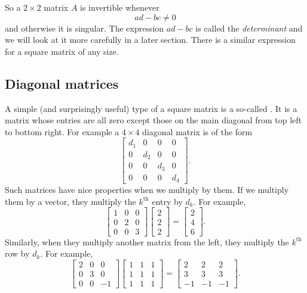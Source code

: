 So a $2 \times 2$ matrix $A$ is invertible whenever
\begin{equation*}
ad - bc \not= 0
\end{equation*}
and otherwise it is singular.  The expression $ad-bc$ is called
the \emph{determinant} and we will look at it 
more carefully in a later section.
There is a similar expression for a square
matrix of any size.

\subsection{Diagonal matrices}

A simple (and surprisingly useful) type of a square matrix is a so-called
\emph{}.  It is a matrix whose entries are all zero
except those on the main diagonal from top left to bottom right.  For
example a $4 \times 4$ diagonal matrix is of the form
\begin{equation*}
\begin{bmatrix}
d_1 & 0 & 0 & 0 \\
0 & d_2 & 0 & 0 \\
0 & 0 & d_3 & 0 \\
0 & 0 & 0 & d_4
\end{bmatrix} .
\end{equation*}
Such matrices have nice properties when we multiply by them.  If we multiply
them by a vector, they multiply the $k^{\text{th}}$ entry by $d_k$.  For
example,
\begin{equation*}
\begin{bmatrix}
1 & 0 & 0 \\
0 & 2 & 0 \\
0 & 0 & 3
\end{bmatrix}
\begin{bmatrix}
2 \\ 2 \\ 2
\end{bmatrix}
=
\begin{bmatrix}
2 \\ 4 \\ 6
\end{bmatrix} .
\end{equation*}
Similarly, when they multiply another matrix from the left, they multiply
the $k^{\text{th}}$ row by $d_k$.  For example,
\begin{equation*}
\begin{bmatrix}
2 & 0 & 0 \\
0 & 3 & 0 \\
0 & 0 & -1
\end{bmatrix}
\begin{bmatrix}
1 & 1 & 1 \\
1 & 1 & 1 \\
1 & 1 & 1 
\end{bmatrix}
=
\begin{bmatrix}
2 & 2 & 2 \\
3 & 3 & 3 \\
-1 & -1 & -1 
\end{bmatrix} .
\end{equation*}
